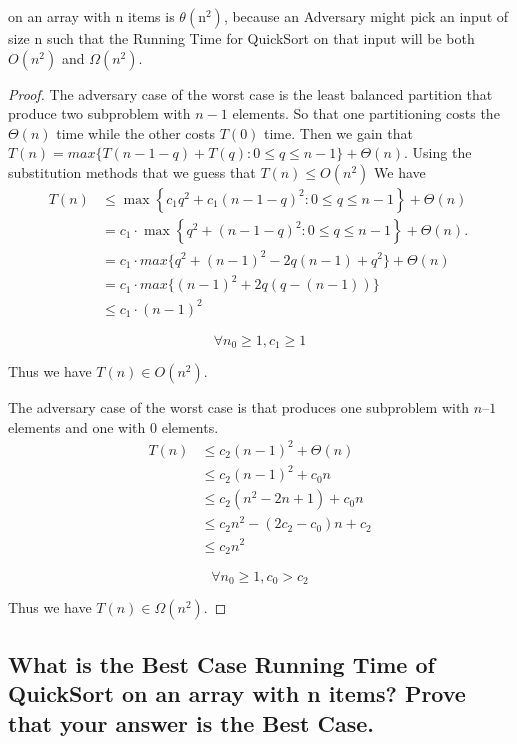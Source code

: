 \documentclass[a4paper]{article}
\begin{document}
on an array with $\mathrm{n}$ items is $\theta\left(\mathrm{n}^2\right)$, because an Adversary might pick an input of size $\mathrm{n}$ such that the Running Time for QuickSort on that input will be both $O\left(n^2\right)$ and $\Omega\left(n^2\right)$.
\begin{proof}
  The adversary case of the worst case is the least balanced partition that produce two subproblem with $n-1$ elements. So that one partitioning costs the $\Theta(n) $ time while the other costs $T(0)$ time. Then we gain that $T(n)=max\{T(n-1-q)+T(q) : 0\leq q\leq n-1\}+ \Theta(n)$. Using the substitution methods that we guess that $T(n)\leq O(n^2)$
  We have
  $$\begin{aligned} T(n) & \leq \max \left\{c_1 q^2+c_1(n-1-q)^2: 0 \leq q \leq n-1\right\}+\Theta(n) \\ &=c_1 \cdot \max \left\{q^2+(n-1-q)^2: 0 \leq q \leq n-1\right\}+\Theta(n) . \
                \\ &= c_1 \cdot max \{q^2+(n-1)^2-2 q(n-1)+q^2\} + \Theta(n)
                \\ &=c_1 \cdot max\{(n-1)^2+2q(q-(n-1)) \}
                \\ &\leq c_1 \cdot(n-1)^2\end{aligned}$$

  $$\forall n_0 \geq 1, c_1\geq 1$$

  Thus we have $T(n)\in O(n^2)$.

  The adversary case of the worst case is that produces one subproblem with $n – 1$ elements and one with 0 elements.
  $$\begin{aligned} T(n) & \leq c_2(n-1)^2+\Theta(n) \\ & \leq c_2(n-1)^2+c_0 n \\ & \leq c_2\left(n^2-2 n+1\right)+c_0 n \\ & \leq c_2 n^2-\left(2 c_2-c_0\right) n+c_2 \\ & \leq c_2 n^2 \end{aligned}$$

  $$\forall n_0 \geq 1, c_0>c_2$$

  Thus we have $T(n)\in \Omega(n^2)$.

\end{proof}

\subsection{What is the Best Case Running Time of QuickSort on an array with n items?  Prove that your answer is the Best Case.}
\end{document}
